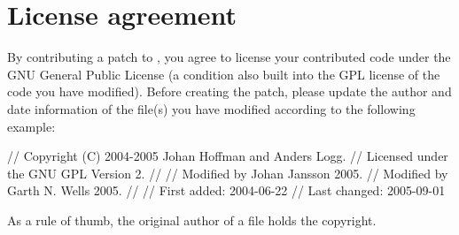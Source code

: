
\section{License agreement}

By contributing a patch to \package{}, you agree to license your
contributed code under the GNU General Public License (a condition
also built into the GPL license of the code you have modified). Before
creating the patch, please update the author and date information of
the file(s) you have modified according to the following example:

\begin{code}
  // Copyright (C) 2004-2005 Johan Hoffman and Anders Logg.
  // Licensed under the GNU GPL Version 2.
  //
  // Modified by Johan Jansson 2005.
  // Modified by Garth N. Wells 2005.
  //
  // First added:  2004-06-22
  // Last changed: 2005-09-01
\end{code}

As a rule of thumb, the original author of a file holds the copyright.
